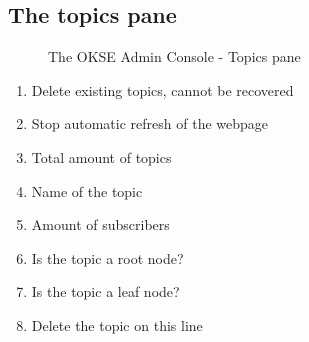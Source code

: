 \clearpage


\subsection{The topics pane}
\begin{center}
  \begin{figure}[ht!]
    \caption{The OKSE Admin Console - Topics pane} 
    \label{fig:OKSE Admin Console - Topics pane}
  \end{figure}
\end{center}
\begin{enumerate}
\item Delete existing topics, cannot be recovered
\item Stop automatic refresh of the webpage
\item Total amount of topics
\item Name of the topic
\item Amount of subscribers
\item Is the topic a root node?
\item Is the topic a leaf node?
\item Delete the topic on this line
\end{enumerate}


\clearpage

